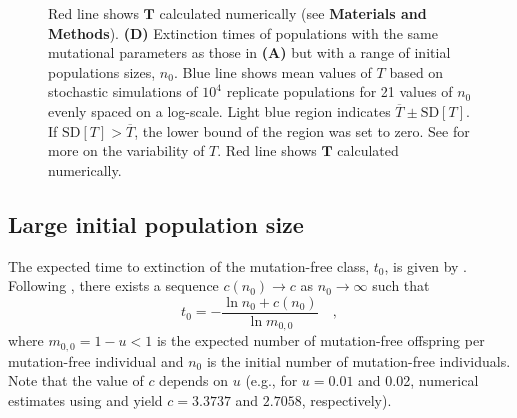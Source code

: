 \documentclass[9pt,lineno]{elife}
\begin{document}
\begin{figure}[ht!]
{Red line shows $\mathbf{T}$ calculated numerically (see \textbf{Materials and Methods}).  
%
\textbf{(D)} Extinction times of populations with the same mutational parameters as those in \textbf{(A)} but with a range of initial populations sizes, $n_0$.
%
Blue line shows mean values of $T$ based on stochastic simulations of $10^4$ replicate populations for 21 values of $n_0$ evenly spaced on a log-scale.
%
Light blue region indicates $\overline{T} \pm  \mathrm{SD}[T]$. If $\mathrm{SD}[T] > \overline{T}$, the lower bound of the region was set to zero.  See  for more on the variability of $T$.
%
Red line shows $\mathbf{T}$ calculated numerically.}
\label{fig:decay}
\label{figsupp:sf1}
\end{figure}


\subsection{Large initial population size}


The expected time to extinction of the mutation-free class, $t_0$, is given by .
Following \citet{Jagers_On_2007}, there exists a sequence $c(n_0)\to c$ as $n_0\to\infty$ such that
%
\begin{equation}
t_0 = -\frac{\ln n_0 + c(n_0)}{\ln m_{0,0}} \quad ,
\label{eq:jagers}
\end{equation}
%
where $m_{0,0} = 1-u <1$ is the expected number of mutation-free offspring per mutation-free individual and $n_0$ is the initial number of mutation-free individuals.  Note that the value of $c$ depends on $u$ (e.g., for $u=0.01$ and 0.02, numerical estimates using  and  yield $c=3.3737$ and $2.7058$, respectively).
\end{document}
